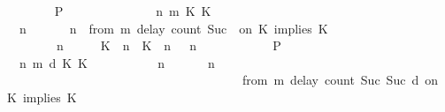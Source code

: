 \begin{isabellebody}
\ \ \ \ \ \ \isamarkupfalse%
\ {\isacharquery}P\ \isamarkupfalse%
\isanewline
\ \ \ \ \isamarkupfalse%
\isanewline
\ \ \ \ \ \ \isamarkupfalse%
\ {\isasymGamma}\ n\ m\ K\ K\ {\isasymPsi}\ {\isasymPhi}\isanewline
\ \ \ \ \ \ \isamarkupfalse%
\ {\isacartoucheopen}{\isacharparenleft}{\isasymGamma}\ n\ {\isasymturnstile}\ {\isasymPsi}\ {\isasymtriangleright}\ {\isasymPhi}\ {\isacharequal}\ {\isacharparenleft}{\isasymGamma}{\isacharcomma}\ n\ {\isasymturnstile}\ {\isacharparenleft}from\ m\ delay\ count\ Suc\ {}\ on\ K\ implies\ K\ {\isacharhash}\ {\isasymPsi}\ {\isasymtriangleright}\ {\isasymPhi}{\isacharparenright}{\isacartoucheclose}\isanewline
\ \ \ \ \ \ \ {\isacartoucheopen}{\isacharparenleft}{\isasymGamma}\ n\ {\isasymturnstile}\ {\isasymPsi}\ {\isasymtriangleright}\ {\isasymPhi}\ {\isacharequal}\ {\isacharparenleft}{\isacharparenleft}{\isacharparenleft}K\ {\isasymUp}\ n{\isacharparenright}\ {\isacharhash}\ {\isacharparenleft}K\ {\isasymUp}\ n{\isacharparenright}\ {\isacharhash}\ {\isasymGamma}{\isacharparenright}{\isacharcomma}\ n\ {\isasymturnstile}\ {\isasymPsi}\ {\isasymtriangleright}\ {\isasymPhi}{\isacharparenright}{\isacartoucheclose}\isanewline
\ \ \ \ \ \ \isamarkupfalse%
\ {\isacharquery}P\ \isamarkupfalse%
\isanewline
\ \ \ \ \isamarkupfalse%
\isanewline
\ \ \ \ \ \ \isamarkupfalse%
\ {\isasymGamma}\ n\ m\ d\ K\ K\ {\isasymPsi}\ {\isasymPhi}\isanewline
\ \ \ \ \ \ \isamarkupfalse%
\ {\isacartoucheopen}{\isacharparenleft}{\isasymGamma}\ n\ {\isasymturnstile}\ {\isasymPsi}\ {\isasymtriangleright}\ {\isasymPhi}\ {\isacharequal}\ {\isacharparenleft}{\isasymGamma}{\isacharcomma}\ n\isanewline
\ \ \ \ \ \ \ \ \ \ \ \ \ \ \ \ \ \ \ \ \ \ \ \ \ \ \ \ \ \ \ \ \ \ \ \ \ {\isasymturnstile}\ {\isacharparenleft}from\ m\ delay\ count\ Suc\ {\isacharparenleft}Suc\ d{\isacharparenright}\ on\ K\ implies\ K\ {\isacharhash}\ {\isasymPsi}\ {\isasymtriangleright}\ {\isasymPhi}{\isacharparenright}{\isacartoucheclose}\isanewline

\end{isabellebody}
